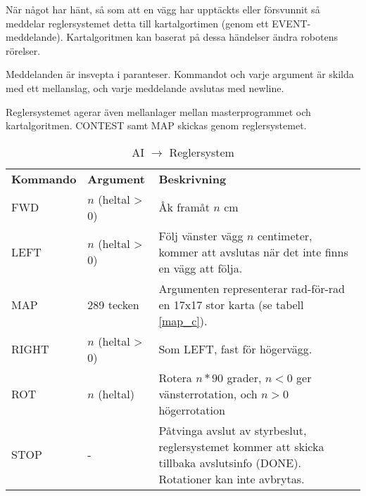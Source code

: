 När något har hänt, så som att en vägg har upptäckts eller försvunnit så
meddelar reglersystemet detta till kartalgortimen (genom ett EVENT-meddelande).
Kartalgoritmen kan baserat på dessa händelser ändra robotens rörelser.

Meddelanden är insvepta i paranteser. Kommandot och varje argument är
skilda med ett mellanslag, och varje meddelande avslutas med newline.

Reglersystemet agerar även mellanlager mellan masterprogrammet och
kartalgoritmen. CONTEST samt MAP skickas genom reglersystemet.

\begin{table}[H]
	\caption{AI $\rightarrow$ Reglersystem}
	\label{ai_reg}
	\begin{tabularx}{\linewidth}{l l X}
	\textbf{Kommando} & \textbf{Argument} & \textbf{Beskrivning} \\
	FWD	& $n$ (heltal > 0) & Åk framåt $n$ cm \\

	LEFT	& $n$ (heltal > 0)& Följ vänster vägg $n$ centimeter, kommer att
	avslutas när det inte finns en vägg att följa. \\

	MAP	& 289 tecken & Argumenten representerar rad-för-rad en 17x17
	stor karta (se tabell \ref{map_c}). \\

	RIGHT	& $n$ (heltal > 0)& Som LEFT, fast för högervägg. \\

	ROT	& $n$ (heltal)	& Rotera $n * 90$ grader, $n < 0$ ger
	vänsterrotation, och $n > 0$ högerrotation\\

	STOP	& -		& Påtvinga avslut av styrbeslut, reglersystemet
	kommer att skicka tillbaka avslutsinfo (DONE). Rotationer kan inte
	avbrytas. \\
	\end{tabularx}
\end{table}

